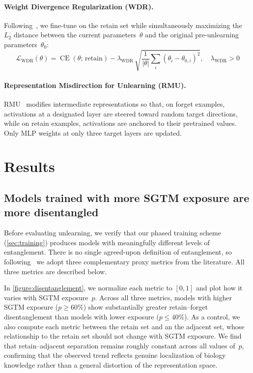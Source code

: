 \documentclass{article} %
\begin{document}
\paragraph{Weight Divergence Regularization (WDR).}
Following~\citet{siddiqui2025dormant}, we fine-tune on the retain set while simultaneously maximizing the $L_2$ distance between the current parameters~$\theta$ and the original pre-unlearning parameters~$\theta_0$:
%
\begin{equation*}
  \mathcal{L}_\text{WDR}(\theta)
  = \operatorname{CE}(\theta;\, \text{retain})
  - \lambda_\text{WDR}\, \sqrt{\frac{1}{|\theta|}\sum_i (\theta_i - \theta_{0,i})^2},
  \quad \lambda_\text{WDR} > 0
\end{equation*}


\paragraph{Representation Misdirection for Unlearning (RMU).}
RMU~\citep{li2024wmdp} modifies intermediate representations so that, on forget examples, activations at a designated layer are steered toward random target directions, while on retain examples, activations are anchored to their pretrained values.
Only MLP weights at only three target layers are updated.
\section{Results}

\subsection{Models trained with more SGTM exposure are more disentangled}
\label{sec:entanglement}

Before evaluating unlearning, we verify that our phased training scheme (\cref{sec:training}) produces models with meaningfully different levels of entanglement. There is no single agreed-upon definition of entanglement, so following~\citet{tang2026logitslatentscontrastiverepresentation} we adopt three complementary proxy metrics from the literature. All three metrics are described below.

In \cref{figure:disentanglement}, we normalize each metric to $[0, 1]$ and plot how it varies with SGTM exposure~$p$. Across all three metrics, models with higher SGTM exposure ($p \geq 60\%$) show substantially greater retain--forget disentanglement than models with lower exposure ($p \leq 40\%$). As a control, we also compute each metric between the retain set and an the adjacent set, whose relationship to the retain set should not change with SGTM exposure. We find that retain--adjacent separation remains roughly constant across all values of~$p$, confirming that the observed trend reflects genuine localization of biology knowledge rather than a general distortion of the representation space.
\end{document}
